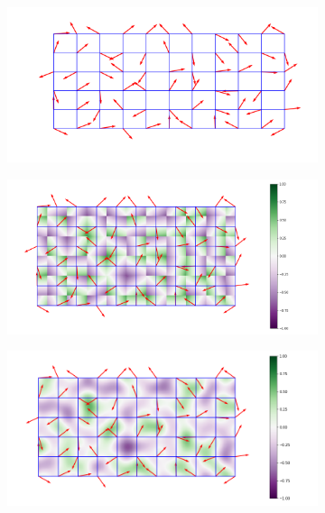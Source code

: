     \begin{figure}
        \centering
        \begin{subfigure}[b]{0.3\textwidth}
             \centering
             \includegraphics[width = \textwidth]{images/grid_grad}
             \caption{}
             \label{fig:grid_grad}
        \end{subfigure}
        \hfill
        \begin{subfigure}[b]{0.3\textwidth}
             \centering
             \includegraphics[width = \textwidth]{images/PerlinNoiseDotProducts}
             \caption{}
             \label{fig:dot_prod}
        \end{subfigure}
        \hfill
        \begin{subfigure}[b]{0.3\textwidth}
             \centering
             \includegraphics[width = \textwidth]{images/PerlinNoiseInterpolated}

\end{subfigure}
\end{figure}
